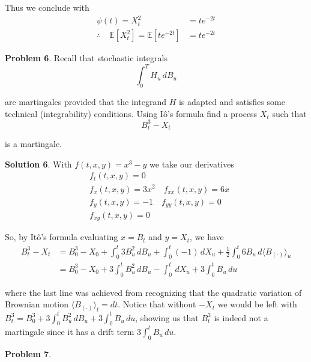 \documentclass[12pt]{article}
\begin{document}
Thus we conclude with
\begin{align*}
	\psi(t) = X_t^2 &= te^{-2t} \\
	\therefore \quad \mathbb E[X_t^2] = \mathbb E[te^{-2t}] &= te^{-2t} 
\end{align*}

{\bf Problem 6}. Recall that stochastic integrals
\begin{equation*}
	\int^T_0 H_u\,dB_u
\end{equation*}

are martingales provided that the integrand $H$ is adapted and satisfies some technical (integrability) conditions. Using I\^{o}'s formula find a process $X_t$ such that
\begin{equation}
	B^3_t - X_t
\end{equation}

is a martingale.

{\bf Solution 6}. With $f(t,x,y) = x^3 - y$ we take our derivatives
\begin{align*}
	&f_t(t,x,y) = 0 \\
	&f_x(t,x,y) = 3x^2 \quad f_{xx}(t,x,y) = 6x \\
	&f_y(t,x,y) = -1 \quad f_{yy}(t,x,y) = 0 \\
	&f_{xy}(t,x,y) = 0
\end{align*} 

So, by It\^{o}'s formula evaluating $x = B_t$ and $y = X_t$, we have
\begin{align*}
	B_t^3 - X_t &= B^3_0 - X_0 + \int^t_0 3B_u^2\,dB_u + \int^t_0 (-1)\,dX_u + \frac{1}{2}\int^t_0 6B_u\,d\langle B_{(\cdot)}\rangle_u \\
	&= B^3_0 - X_0 + 3\int^t_0 B_u^2\,dB_u - \int^t_0 \,dX_u + 3\int^t_0 B_u\,du
\end{align*}

where the last line was achieved from recognizing that the quadratic variation of Brownian motion $\langle B_{(\cdot)}\rangle_t = dt$. Notice that without $-X_t$ we would be left with $B_t^3 = B^3_0 + 3\int^t_0 B_u^2\,dB_u + 3\int^t_0 B_u\,du$, showing us that $B_t^3$ is indeed not a martingale since it has a drift term $3\int^t_0 B_u\,du$.

{\bf Problem 7}.
\end{document}
